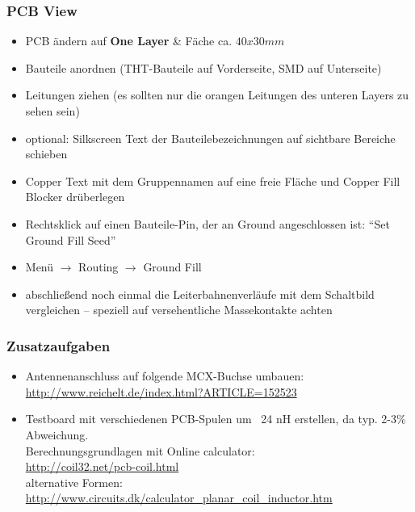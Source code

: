 \subsubsection{PCB View}

\begin{itemize}
    \item PCB ändern auf \textbf{One Layer} \& Fäche ca. $40x30mm$
    \item Bauteile anordnen (THT-Bauteile auf Vorderseite, SMD auf Unterseite)
    \item Leitungen ziehen (es sollten nur die orangen Leitungen des unteren Layers zu sehen sein)
    \item optional: Silkscreen Text der Bauteilebezeichnungen auf sichtbare Bereiche schieben
    \item Copper Text mit dem Gruppennamen auf eine freie Fläche und Copper Fill
      Blocker drüberlegen
    \item Rechtsklick auf einen Bauteile-Pin, der an Ground angeschlossen ist: "`Set Ground Fill Seed"'
    \item Menü $\rightarrow$ Routing $\rightarrow$ Ground Fill
    \item abschließend noch einmal die Leiterbahnenverläufe mit dem Schaltbild
          vergleichen -- speziell auf versehentliche Massekontakte achten
\end{itemize}

\subsubsection{Zusatzaufgaben}

\begin{itemize}
    \item Antennenanschluss auf folgende MCX-Buchse umbauen: \\
          \url{http://www.reichelt.de/index.html?ARTICLE=152523}
    \item Testboard mit verschiedenen PCB-Spulen um ~24 nH erstellen, da typ. 2-3\% Abweichung. \\
          Berechnungsgrundlagen mit Online calculator:\\
          \url{http://coil32.net/pcb-coil.html}\\
          alternative Formen: \\
          \url{http://www.circuits.dk/calculator_planar_coil_inductor.htm}
\end{itemize}
